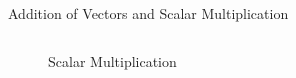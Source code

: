 \documentclass[10pt, aspectratio=169]{beamer}
\begin{document}
\begin{frame}{Addition of Vectors and Scalar Multiplication}
\begin{columns}
\begin{column}{0.35\textwidth}
{\begin{figure}
        \caption{Scalar Multiplication}
    \end{figure}}
    \end{column}
\end{columns}
\end{frame}
\end{document}
